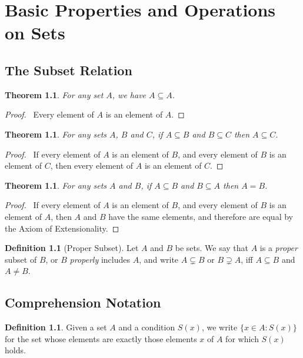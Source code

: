 \documentclass{report}
\let\qed\relax
\newtheorem{thm}[ax]{Theorem}
\theoremstyle{definition}
\newtheorem{df}[ax]{Definition}
\begin{document}
\chapter{Basic Properties and Operations on Sets}

\section{The Subset Relation}

\begin{thm}
For any set $A$, we have $A \subseteq A$.
\end{thm}

\begin{proof}
\pf\ Every element of $A$ is an element of $A$. \qed
\end{proof}

\begin{thm}
For any sets $A$, $B$ and $C$, if $A \subseteq B$ and $B \subseteq C$ then $A \subseteq C$.
\end{thm}

\begin{proof}
\pf\ If every element of $A$ is an element of $B$, and every element of $B$ is an element of $C$, then every element of $A$ is an element of $C$. \qed
\end{proof}

\begin{thm}
For any sets $A$ and $B$, if $A \subseteq B$ and $B \subseteq A$ then $A = B$.
\end{thm}

\begin{proof}
\pf\ If every element of $A$ is an element of $B$, and every element of $B$ is an element of $A$, then $A$ and $B$ have the same elements, and therefore are equal by the Axiom of Extensionality. \qed
\end{proof}

\begin{df}[Proper Subset]
Let $A$ and $B$ be sets. We say that $A$ is a \emph{proper} subset of $B$, or $B$ \emph{properly} includes $A$, and write $A \subsetneq B$ or $B \supsetneq A$, iff $A \subseteq B$ and $A \neq B$.
\end{df}

\section{Comprehension Notation}

\begin{df}
Given a set $A$ and a condition $S(x)$, we write $\{ x \in A : S(x) \}$ for the set whose elements are exactly those elements $x$ of $A$ for which $S(x)$ holds.
\end{df}
\end{document}
